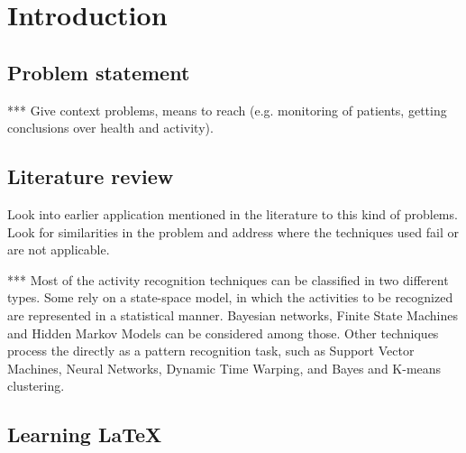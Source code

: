 
\chapter{Introduction} %

\label{Chapter1} %



\section{Problem statement}
*** Give context problems, means to reach (e.g. monitoring of patients, 
getting conclusions over health and activity).

\section{Literature review}
Look into earlier application mentioned in the literature to this kind of 
problems. Look for similarities in the problem and address where the 
techniques used fail or are not applicable.

*** Most of the activity recognition techniques can be classified in two 
different types. Some rely on a state-space model, in which the activities to 
be recognized are represented in a statistical manner. Bayesian networks, 
Finite State Machines and Hidden Markov Models can be considered among those. 
Other techniques process the directly as a pattern recognition task, such as 
Support Vector Machines, Neural Networks, Dynamic Time Warping, and Bayes and 
K-means clustering.


\section{Learning \LaTeX{}}


